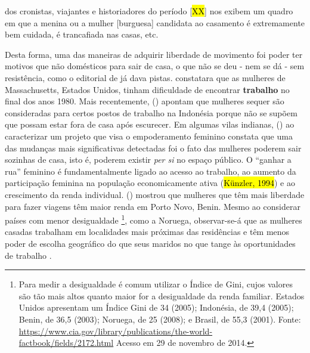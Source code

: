 \begin{citacao}
dos cronistas, viajantes e historiadores do período [\hl{XX}] nos exibem um quadro em que a menina ou a mulher [burguesa] candidata ao casamento é extremamente bem cuidada, é trancafiada nas casas, etc.
\end{citacao}




Desta forma, uma das maneiras de adquirir liberdade de movimento foi poder ter motivos que não domésticos para sair de casa, o que não se deu - nem se dá - sem resistência, como o editorial de  já dava pistas.  constatara que as mulheres de Massachusetts, Estados Unidos, tinham dificuldade de encontrar \textbf{trabalho} no final dos anos 1980.
Mais recentemente, 
 (\citeyear{ELMHIRST2003}) apontam que mulheres sequer são consideradas para certos postos de trabalho na Indonésia porque não se supõem que possam estar fora de casa após escurecer. Em algumas vilas indianas,  (\citeyear{RAJU2005}) ao caracterizar um projeto que visa o empoderamento feminino constata que uma das mudanças mais significativas detectadas foi o fato das mulheres poderem sair sozinhas de casa, isto é, poderem existir \emph{per si} no espaço público.
O ``ganhar a rua'' feminino é fundamentalmente ligado ao acesso ao trabalho, ao aumento da participação feminina na população economicamente ativa (\hl{Künzler, 1994}) e ao crescimento da renda individual.   (\citeyear{MANDEL2004}) mostrou que mulheres que têm mais liberdade para fazer viagens têm maior renda em Porto Novo, Benin.
Mesmo ao considerar países com menor desigualdade
\footnote{Para medir a desigualdade é comum utilizar o Índice de Gini, cujos valores são tão mais altos quanto maior for a desigualdade da renda familiar. Estados Unidos apresentam um Índice Gini de 34 (2005); Indonésia, de 39,4 (2005); Benin, de 36,5 (2003); Noruega, de 25 (2008); e Brasil, de 55,3 (2001). Fonte: \url{https://www.cia.gov/library/publications/the-world-factbook/fields/2172.html} Acesso em 29 de novembro de 2014.}, como a Noruega, observar-se-á que as mulheres casadas trabalham em localidades mais próximas das residências e têm menos poder de escolha geográfico do que seus maridos no que tange às oportunidades de trabalho \cite{HJORTHOL2000}.

